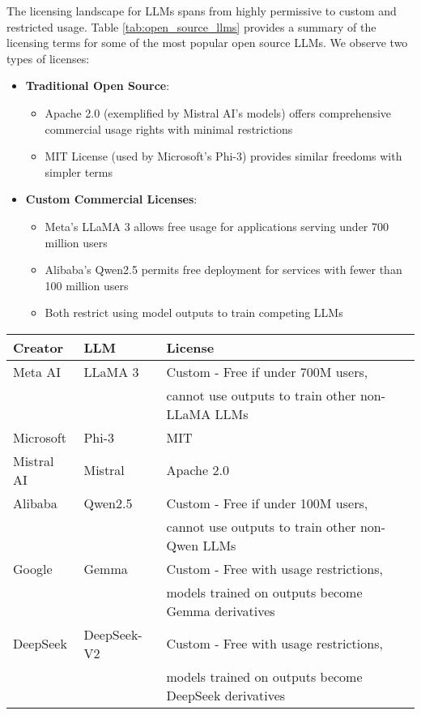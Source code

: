 The licensing landscape for LLMs spans from highly permissive to custom and restricted usage. Table \ref{tab:open_source_llms} provides a summary of the licensing terms for some of the most popular open source LLMs. We observe two types of licenses:
\begin{itemize}
    \item \textbf{Traditional Open Source}:
    \begin{itemize}
        \item Apache 2.0 (exemplified by Mistral AI's models) offers comprehensive commercial usage rights with minimal restrictions
        \item MIT License (used by Microsoft's Phi-3) provides similar freedoms with simpler terms
    \end{itemize}
    \item \textbf{Custom Commercial Licenses}:
    \begin{itemize}
        \item Meta's LLaMA 3 allows free usage for applications serving under 700 million users
        \item Alibaba's Qwen2.5 permits free deployment for services with fewer than 100 million users
        \item Both restrict using model outputs to train competing LLMs
    \end{itemize}
\end{itemize}
\begin{table*}[h!]
\centering
\caption{Sample Open Source LLMs Licenses.}
\label{tab:open_source_llms}
\begin{tabular}{p{2cm}p{2cm}p{10cm}}
\hline
Creator & LLM & License \\
\hline
Meta AI & LLaMA 3 & Custom - Free if under 700M users,\\
& & cannot use outputs to train other non-LLaMA LLMs \\
Microsoft & Phi-3 & MIT \\
Mistral AI & Mistral & Apache 2.0 \\
Alibaba & Qwen2.5 & Custom - Free if under 100M users,\\
& & cannot use outputs to train other non-Qwen LLMs \\
Google & Gemma & Custom - Free with usage restrictions,\\
& & models trained on outputs become Gemma derivatives \\
DeepSeek & DeepSeek-V2 & Custom - Free with usage restrictions,\\
& & models trained on outputs become DeepSeek derivatives \\
\hline
\end{tabular}
\end{table*}


